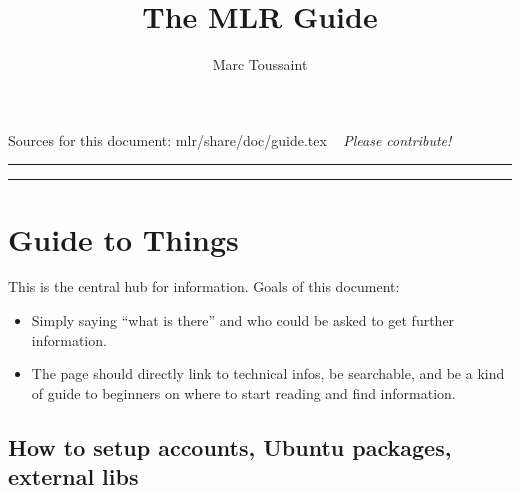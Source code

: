 

\title{The MLR Guide}
\author{Marc Toussaint}


\maketitle

\centerline{Sources for this document: mlr/share/doc/guide.tex ~ \emph{Please contribute!}}

{\bigskip\hrule\vspace*{-2ex}\small\tableofcontents\medskip\hrule}

\section{Guide to Things}

This is the central hub for information. Goals of this document:
\begin{itemize}
\item Simply saying ``what is there'' and who could be asked to get further information.

\item The page should directly link to technical infos, be searchable, and be a kind of guide to beginners on where to start reading and find information.
\end{itemize}


\subsection{How to setup accounts, Ubuntu packages, external libs}

